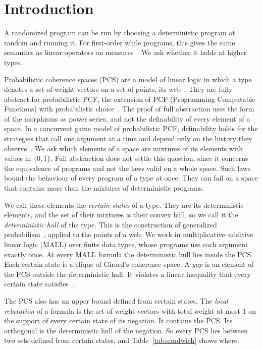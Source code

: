 \section{Introduction}
\label{sec:intro}

A randomized program can be run by choosing a deterministic program at
random and running it. For first-order while programs, this gives the same
semantics as linear operators on measures~\cite{kozen1981}. We ask
whether it holds at higher types.

Probabilistic coherence spaces (PCS) are a model of linear logic in which a type
denotes a set of weight vectors on a set of points, its
web~\cite{girard2004,danos-ehrhard2011}. They are fully abstract for
probabilistic PCF, the extension of PCF (Programming Computable
Functions) with probabilistic
choice~\cite{ehrhard-pagani-tasson2018}. The proof of full abstraction
uses the form of the morphisms as power series, and not the definability
of every element of a space. In a concurrent game model of probabilistic
PCF, definability holds for the strategies that call one argument at a
time and depend only on the history they observe~\cite{castellan2018}.
We ask which elements of a space are mixtures of its elements with values in
$\{0,1\}$. Full abstraction does not settle this question, since it
concerns the equivalence of programs and not the laws valid on a whole
space. Such laws bound the behaviour of every program of a type at once. They
can fail on a space that contains more than the mixtures of deterministic
programs.

We call these elements the \emph{certain states} of a type. They are its
deterministic elements, and the set of their mixtures is their convex
hull, so we call it the \emph{deterministic hull} of the type. This is the construction of
generalized probabilism~\cite{paris2001,williams2012}, applied to the
points of a web. We work in multiplicative--additive linear logic (MALL)
over finite data types, whose programs use each argument exactly once. At
every MALL formula the deterministic hull lies inside the PCS. Each certain state is a clique of
Girard's coherence space. A
\emph{gap} is an element of the PCS outside the deterministic
hull. It violates a linear inequality that every certain state
satisfies~\cite{definetti1974,paris2001}.

The PCS also has an upper bound defined from certain states.
The \emph{local relaxation} of a formula is the set of weight vectors with
total weight at most $1$ on the support of every certain state of its
negation. It contains the PCS. Its orthogonal is the deterministic hull
of the negation. So every PCS lies between two sets defined from certain
states, and Table~\ref{tab:sandwich} shows where.

